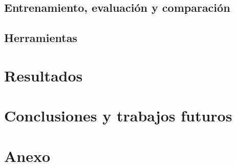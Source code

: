 \documentclass[a4paper,12pt,spanish]{book}
\begin{document}
\section{Entrenamiento, evaluación y comparación} \label{sec:comparacion}


\section{Herramientas}


\chapter{Resultados} \label{chap:resultados}










\chapter{Conclusiones y trabajos futuros}


\newpage
\footnotesize
\printbibliography[heading=bibintoc]

\appendix
\chapter*{Anexo}
\label{chap:anexo}


\newpage
\newpage
\vfill
\addtocounter{page}{-1}
\clearpage
\thispagestyle{empty}
\phantom{a}
\vfill
\newpage
\vfill
\addtocounter{page}{-1}
\end{document}
